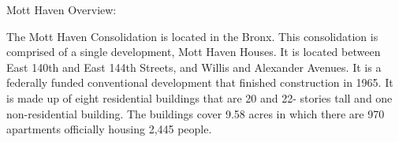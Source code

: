 Mott Haven Overview:     

   

The Mott Haven Consolidation is located in the Bronx. This consolidation is comprised of a single development, Mott Haven Houses. It is located between East 140th and East 144th Streets, and Willis and Alexander Avenues. It is a federally funded conventional development that finished construction in 1965. It is made up of eight residential buildings that are 20 and 22- stories tall and one non-residential building. The buildings cover 9.58 acres in which there are 970 apartments officially housing 2,445 people.